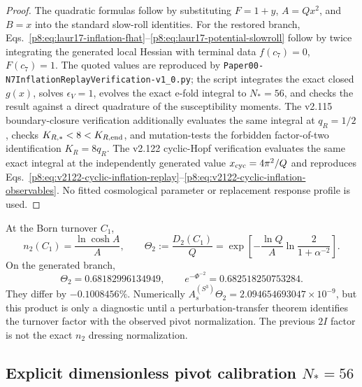 \documentclass[12pt,a4paper]{article}
\begin{document}
\begin{proof}
The quadratic formulas follow by substituting $F=1+y$, $A=Qx^2$, and $B=x$
into the standard slow-roll identities.  For the restored branch,
Eqs.~\eqref{p8:eq:laur17-inflation-fhat}--\eqref{p8:eq:laur17-potential-slowroll}
follow by twice integrating the generated local Hessian with terminal data
$f(c_7)=0$, $F(c_7)=1$.  The quoted values are reproduced by
\texttt{Paper00-\allowbreak N7Inflation\allowbreak Replay\allowbreak Verification-v1\_0.py}; the script integrates
the exact closed $g(x)$, solves $\epsilon_V=1$, evolves the exact e-fold
integral to $N_*=56$, and checks the result against a direct quadrature of the
susceptibility moments.  The v2.115 boundary-closure verification additionally
evaluates the same integral at \(q_R=1/2\), checks
\(K_{R,*}<8<K_{R,\rm end}\), and mutation-tests the forbidden factor-of-two
identification \(K_R=8q_R\).  The v2.122 cyclic-Hopf verification evaluates the same exact integral at the independently generated value \(x_{\rm cyc}=4\pi^2/Q\) and reproduces Eqs.~\eqref{p8:eq:v2122-cyclic-inflation-replay}--\eqref{p8:eq:v2122-cyclic-inflation-observables}.  No fitted cosmological parameter or replacement
response profile is used.
\end{proof}

\begin{proposition}
\label{paper6c:proposition:atlas-intrinsic-turnover-factor-and-the-old-2i-diagn-e4114a6}%

At the Born turnover \(C_1\),
\begin{equation}
\label{p8:eq:n2-turnover-factor}
 n_2(C_1)=\frac{\ln\cosh A}{A},\qquad
 \Theta_2:=\frac{D_2(C_1)}Q
 =\exp\!\left[-\frac{\ln Q}{A}
 \ln\!\frac{2}{1+\alpha^{-2}}\right].
\end{equation}
On the generated branch,
\[
 \Theta_2=0.68182996134949,
 \qquad e^{-\Phi^{-2}}=0.682518250753284.
\]
They differ by \(-0.1008456\%\).  Numerically
\(A_s^{(S^3)}\Theta_2=2.094654693047\times10^{-9}\), but this product is
only a diagnostic until a perturbation-transfer theorem identifies the
turnover factor with the observed pivot normalization.  The previous
\(2I\) factor is not the exact \(n_2\) dressing normalization.
\end{proposition}

\subsection{Explicit dimensionless pivot calibration \(N_*=56\)}
\label{p8:subsec:N56}
\end{document}
